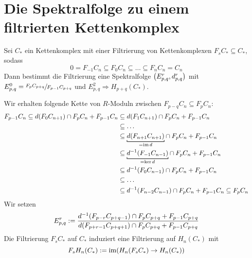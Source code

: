 \section{Die Spektralfolge zu einem filtrierten Kettenkomplex} %
\label{sec:15}

\begin{satz}
	Sei $C_*$ ein Kettenkomplex mit einer Filtrierung von Kettenkomplexen $F_s C_* \subseteq C_*$, sodass
	\[
		0 = F_{-1}C_n \subseteq F_0 C_n \subseteq \ldots \subseteq F_n C_n = C_n
	\]
	Dann bestimmt die Filtrierung eine Spektralfolge $\enbrace*{E^r_{p,q},d^r_{p,q}}$ mit $E_{p,q}^0 = \sfrac{F_p C_{p+q}}{F_{p-1} C_{p+q}}$ und $E^2_{p,q} \Rightarrow H_{p+q}(C_*)$.
\end{satz}

Wir erhalten folgende Kette von $R$-Moduln zwischen $F_{p-q} C_n \subseteq F_p C_n$:
\begin{align}
	F_{p-1} C_n \subseteq d \enbrace*{F_0 C_{n+1}} \cap F_p C_n + F_{p-1} C_n &\subseteq d \enbrace*{F_1 C_{n+1}}\cap F_p C_n + F_{p-1} C_n \\
	&\subseteq \ldots \\
	&\subseteq \Underbracket{d \enbrace*{F_{n+1} C_{n+1}}}{=\im d} \cap F_p C_n + F_{p-1} C_n \\
	&\subseteq \Underbracket{d^{-1} \enbrace*{F_{-1} C_{n-1}}}{=\ker d} \cap F_p C_n + F_{p-1} C_n \\
	&\subseteq d^{-1}\enbrace*{F_0 C_{n-1}}\cap F_p C_n + F_{p-1} C_n \\
	&\subseteq \ldots  \\
	&\subseteq d^{-1} \enbrace*{F_{n-2}C_{n-1}} \cap F_p C_n + F_{p-1} C_n \subseteq F_p C_n
\end{align}
Wir setzen 
\[
	E^r_{p,q} := \frac{d^{-1}\enbrace*{F_{p-r} C_{p+q-1}} \cap F_p C_{p+q} + F_{p-1}C_{p+q}}{d \enbrace*{F_{p+r-1} C_{p+q+1}} \cap F_p C_{p+q} + F_{p-1} C_{p+q}}
\]
Die Filtrierung $F_s C_*$ auf $C_*$ induziert eine Filtrierung auf $H_n(C_*)$ mit 
\[
	F_s H_n(C_*) := \im \enbrace*{H_n(F_s C_*) \to H_n(C_*)}
\]

